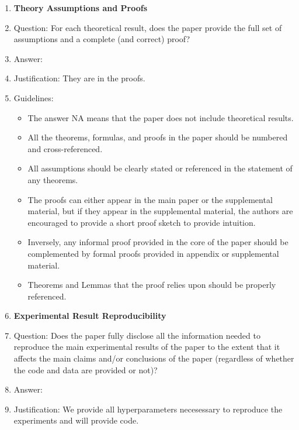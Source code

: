 \documentclass{article} %
\begin{document}
{\begin{appendices}
\begin{enumerate}
\item {\bf Theory Assumptions and Proofs}
    \item[] Question: For each theoretical result, does the paper provide the full set of assumptions and a complete (and correct) proof?
    \item[] Answer: \answerYes{} %
    \item[] Justification: They are in the proofs.
    \item[] Guidelines:
    \begin{itemize}
        \item The answer NA means that the paper does not include theoretical results. 
        \item All the theorems, formulas, and proofs in the paper should be numbered and cross-referenced.
        \item All assumptions should be clearly stated or referenced in the statement of any theorems.
        \item The proofs can either appear in the main paper or the supplemental material, but if they appear in the supplemental material, the authors are encouraged to provide a short proof sketch to provide intuition. 
        \item Inversely, any informal proof provided in the core of the paper should be complemented by formal proofs provided in appendix or supplemental material.
        \item Theorems and Lemmas that the proof relies upon should be properly referenced. 
    \end{itemize}

    \item {\bf Experimental Result Reproducibility}
    \item[] Question: Does the paper fully disclose all the information needed to reproduce the main experimental results of the paper to the extent that it affects the main claims and/or conclusions of the paper (regardless of whether the code and data are provided or not)?
    \item[] Answer: \answerYes{}
    \item[] Justification: We provide all hyperparameters necesessary to reproduce the experiments and will provide code.



\end{enumerate}
\end{appendices}}
\end{document}

